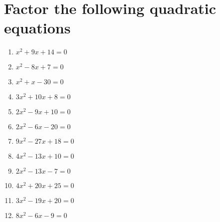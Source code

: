 \documentclass[12pt]{article}
\begin{document}
\section*{Factor the following quadratic equations}
\begin{minipage}[t]{0.45\textwidth}
    \begin{enumerate}[label=\#\arabic*]
        \setcounter{enumi}{0} %
        \item  $x^2+9x+14=0$
        \vspace{1em}
        \item  $x^2-8x+7=0$
        \vspace{1em}
        \item  $x^2+x-30=0$
        \vspace{1em}
        \item  $3x^2+10x+8=0$
        \vspace{1em}
        \item  $2x^2-9x+10=0$
        \vspace{1em}
        \item  $2x^2-6x-20=0$
        \end{enumerate}
\end{minipage}%
\hspace{1cm}
\begin{minipage}[t]{0.45\textwidth}
    \begin{enumerate}[label=\#\arabic*]
        \setcounter{enumi}{6} %
        \item  $9x^2-27x+18=0$
        \vspace{1em}
        \item  $4x^2-13x+10=0$
        \vspace{1em}
        \item  $2x^2-13x-7=0$
        \vspace{1em}
        \item  $4x^2+20x+25=0$
        \vspace{1em}
        \item  $3x^2-19x+20=0$
        \vspace{1em}
        \item  $8x^2-6x-9=0$

    \end{enumerate}
\end{minipage}

\begin{comment}
Notes:
- make ++ to ++, -- to +- table etc
- double check forms
- connect to zeros
- similar thing but a is not 1 as before
- show how graph is affected
- (x-m)(x-n) to (x+m)(x+n)
- backwards and expand to quadratic
- factor vs quadratic formula worksheet
\end{comment}
\end{document}
